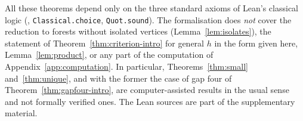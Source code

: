 All these theorems depend only on the three standard axioms of Lean's
classical logic (, \texttt{Classical.choice},
\texttt{Quot.sound}). The formalisation does \emph{not} cover the reduction to
forests without isolated vertices (Lemma~\ref{lem:isolates}), the statement
of Theorem~\ref{thm:criterion-intro} for general $h$ in the form given here,
Lemma~\ref{lem:product}, or any part of the computation of
Appendix~\ref{app:computation}. In particular, Theorems~\ref{thm:small} and~\ref{thm:unique}, and
with the former the case of gap four of Theorem~\ref{thm:gapfour-intro}, are
computer-assisted results in the usual sense and not formally verified ones.
The Lean sources are part of the supplementary material.

